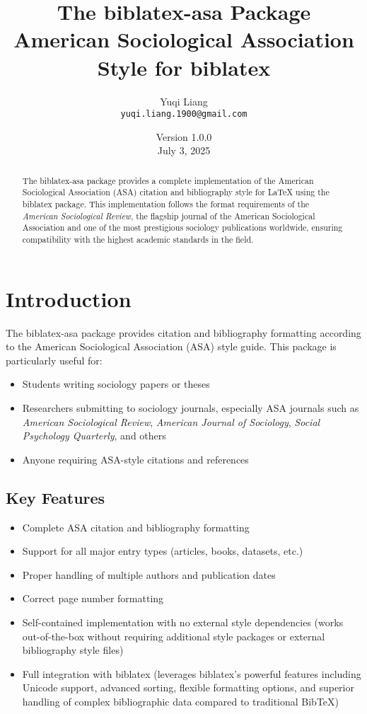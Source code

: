 \documentclass[11pt,a4paper]{ltxdoc}
\title{The \textsf{biblatex-asa} Package\\
       \Large American Sociological Association Style for \textsf{biblatex}}
\author{Yuqi Liang\\
        \texttt{yuqi.liang.1900@gmail.com}}
\date{Version 1.0.0\\July 3, 2025}
\begin{document}
\maketitle

\begin{abstract}
The \textsf{biblatex-asa} package provides a complete implementation of the American Sociological Association (ASA) citation and bibliography style for LaTeX using the \textsf{biblatex} package. This implementation follows the format requirements of the \emph{American Sociological Review}, the flagship journal of the American Sociological Association and one of the most prestigious sociology publications worldwide, ensuring compatibility with the highest academic standards in the field.
\end{abstract}

\tableofcontents

\section{Introduction}

The \textsf{biblatex-asa} package provides citation and bibliography formatting according to the American Sociological Association (ASA) style guide. This package is particularly useful for:

\begin{itemize}
  \item Students writing sociology papers or theses
  \item Researchers submitting to sociology journals, especially ASA journals such as \emph{American Sociological Review}, \emph{American Journal of Sociology}, \emph{Social Psychology Quarterly}, and others
  \item Anyone requiring ASA-style citations and references
\end{itemize}

\subsection{Key Features}

\begin{itemize}
  \item Complete ASA citation and bibliography formatting
  \item Support for all major entry types (articles, books, datasets, etc.)
  \item Proper handling of multiple authors and publication dates
  \item Correct page number formatting
  \item Self-contained implementation with no external style dependencies (works out-of-the-box without requiring additional style packages or external bibliography style files)
  \item Full integration with \textsf{biblatex} (leverages biblatex's powerful features including Unicode support, advanced sorting, flexible formatting options, and superior handling of complex bibliographic data compared to traditional BibTeX)
\end{itemize}
\end{document}
